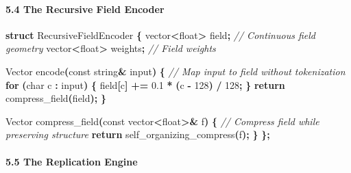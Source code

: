 \documentclass[
  11pt,
  a4paper,
]{article}
\newenvironment{Shaded}{\begin{snugshade}}{\end{snugshade}}
\newcommand{\AttributeTok}[1]{\textcolor[rgb]{0.13,0.29,0.53}{#1}}
\newcommand{\CommentTok}[1]{\textcolor[rgb]{0.56,0.35,0.01}{\textit{#1}}}
\newcommand{\ControlFlowTok}[1]{\textcolor[rgb]{0.13,0.29,0.53}{\textbf{#1}}}
\newcommand{\DataTypeTok}[1]{\textcolor[rgb]{0.13,0.29,0.53}{#1}}
\newcommand{\DecValTok}[1]{\textcolor[rgb]{0.00,0.00,0.81}{#1}}
\newcommand{\FloatTok}[1]{\textcolor[rgb]{0.00,0.00,0.81}{#1}}
\newcommand{\KeywordTok}[1]{\textcolor[rgb]{0.13,0.29,0.53}{\textbf{#1}}}
\newcommand{\NormalTok}[1]{#1}
\newcommand{\OperatorTok}[1]{\textcolor[rgb]{0.81,0.36,0.00}{\textbf{#1}}}
\begin{document}
\paragraph{5.4 The Recursive Field
Encoder}\label{the-recursive-field-encoder}

\begin{Shaded}
\begin{Highlighting}[]
\KeywordTok{struct}\NormalTok{ RecursiveFieldEncoder }\OperatorTok{\{}
\NormalTok{    vector}\OperatorTok{\textless{}}\DataTypeTok{float}\OperatorTok{\textgreater{}}\NormalTok{ field}\OperatorTok{;}      \CommentTok{// Continuous field geometry}
\NormalTok{    vector}\OperatorTok{\textless{}}\DataTypeTok{float}\OperatorTok{\textgreater{}}\NormalTok{ weights}\OperatorTok{;}    \CommentTok{// Field weights}
    
\NormalTok{    Vector encode}\OperatorTok{(}\AttributeTok{const}\NormalTok{ string}\OperatorTok{\&}\NormalTok{ input}\OperatorTok{)} \OperatorTok{\{}
        \CommentTok{// Map input to field without tokenization}
        \ControlFlowTok{for} \OperatorTok{(}\DataTypeTok{char}\NormalTok{ c }\OperatorTok{:}\NormalTok{ input}\OperatorTok{)} \OperatorTok{\{}
\NormalTok{            field}\OperatorTok{[}\NormalTok{c}\OperatorTok{]} \OperatorTok{+=} \FloatTok{0.1} \OperatorTok{*} \OperatorTok{(}\NormalTok{c }\OperatorTok{{-}} \DecValTok{128}\OperatorTok{)} \OperatorTok{/} \DecValTok{128}\OperatorTok{;}
        \OperatorTok{\}}
        \ControlFlowTok{return}\NormalTok{ compress\_field}\OperatorTok{(}\NormalTok{field}\OperatorTok{);}
    \OperatorTok{\}}
    
\NormalTok{    Vector compress\_field}\OperatorTok{(}\AttributeTok{const}\NormalTok{ vector}\OperatorTok{\textless{}}\DataTypeTok{float}\OperatorTok{\textgreater{}\&}\NormalTok{ f}\OperatorTok{)} \OperatorTok{\{}
        \CommentTok{// Compress field while preserving structure}
        \ControlFlowTok{return}\NormalTok{ self\_organizing\_compress}\OperatorTok{(}\NormalTok{f}\OperatorTok{);}
    \OperatorTok{\}}
\OperatorTok{\};}
\end{Highlighting}
\end{Shaded}

\paragraph{5.5 The Replication Engine}\label{the-replication-engine}
\end{document}
